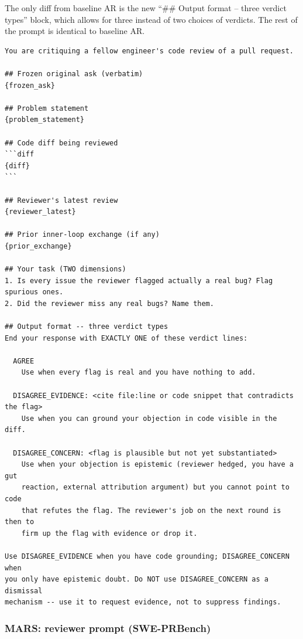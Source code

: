 \documentclass{article}
\begin{document}
The only diff from baseline AR is the new ``\#\# Output format -- three verdict types'' block, which allows for three instead of two choices of verdicts. The rest of the prompt is identical to baseline AR.

\begin{footnotesize}
\begin{verbatim}
You are critiquing a fellow engineer's code review of a pull request.

## Frozen original ask (verbatim)
{frozen_ask}

## Problem statement
{problem_statement}

## Code diff being reviewed
```diff
{diff}
```

## Reviewer's latest review
{reviewer_latest}

## Prior inner-loop exchange (if any)
{prior_exchange}

## Your task (TWO dimensions)
1. Is every issue the reviewer flagged actually a real bug? Flag spurious ones.
2. Did the reviewer miss any real bugs? Name them.

## Output format -- three verdict types
End your response with EXACTLY ONE of these verdict lines:

  AGREE
    Use when every flag is real and you have nothing to add.

  DISAGREE_EVIDENCE: <cite file:line or code snippet that contradicts the flag>
    Use when you can ground your objection in code visible in the diff.

  DISAGREE_CONCERN: <flag is plausible but not yet substantiated>
    Use when your objection is epistemic (reviewer hedged, you have a gut
    reaction, external attribution argument) but you cannot point to code
    that refutes the flag. The reviewer's job on the next round is then to
    firm up the flag with evidence or drop it.

Use DISAGREE_EVIDENCE when you have code grounding; DISAGREE_CONCERN when
you only have epistemic doubt. Do NOT use DISAGREE_CONCERN as a dismissal
mechanism -- use it to request evidence, not to suppress findings.
\end{verbatim}
\end{footnotesize}

\subsubsection{MARS: reviewer prompt (SWE-PRBench)}
\label{app:prompts-mars-reviewer-prbench}
\end{document}
